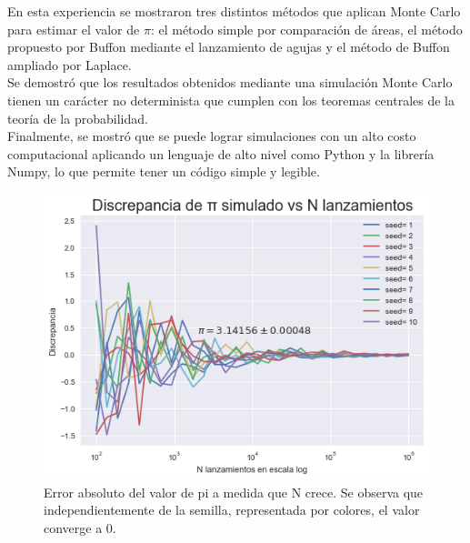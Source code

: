 \documentclass{rbf}
\begin{document}
En esta experiencia se mostraron tres distintos métodos que aplican Monte Carlo para estimar el valor de $\pi$: el método simple por comparación de áreas, el método propuesto por Buffon mediante el lanzamiento de agujas y el método de Buffon ampliado por Laplace. \\
Se demostró que los resultados obtenidos mediante una simulación Monte Carlo tienen un carácter no determinista que cumplen con los teoremas centrales de la teoría de la probabilidad. \\

Finalmente, se mostró que se puede lograr simulaciones con un alto costo computacional aplicando un lenguaje de alto nivel como Python y la librería Numpy, lo que permite tener un código simple y legible.

\begin{figure}[tp]
  \includegraphics[scale=0.5]{figures/errors.png}
	\caption{Error absoluto del valor de pi a medida que N crece. Se observa que independientemente de la semilla, representada por colores, el valor converge a 0.}
 \label{buff4}
\end{figure}
\end{document}
